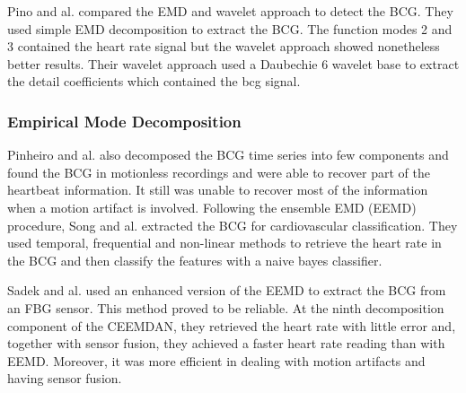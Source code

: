 \documentclass[twoside,twocolumn]{article}
\begin{document}
		Pino and al. \cite{pino_noninvasive_2015} compared the EMD and wavelet approach to detect the BCG. They used simple EMD decomposition to extract the BCG. The function modes 2 and 3 contained the heart rate signal but the wavelet approach showed nonetheless better results. Their wavelet approach used a Daubechie 6 wavelet base to extract the detail coefficients which contained the bcg signal. 
		
		\subsubsection{Empirical Mode Decomposition}
		Pinheiro and al. \cite{pinheiro_online_2010} also decomposed the BCG time series into few components and found the BCG in motionless recordings and were able to recover part of the heartbeat information. It still was unable to recover most of the information when a motion artifact is involved. 
		Following the ensemble EMD (EEMD) procedure, Song and al. \cite{song_extracting_2015} extracted the BCG for cardiovascular classification. They used temporal, frequential and non-linear methods to retrieve the heart rate in the BCG and then classify the features with a naive bayes classifier. 
		
		Sadek and al. \cite{sadek_automatic_2015} used an enhanced version of the EEMD to extract the BCG from an FBG sensor. This method proved to be reliable. At the ninth decomposition component of the CEEMDAN, they retrieved the heart rate with little error and, together with sensor fusion, they achieved a faster heart rate reading than with EEMD. Moreover, it was more efficient in dealing with motion artifacts and having sensor fusion. 
		
\end{document}
